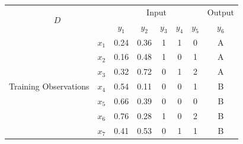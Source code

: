 \documentclass{article}
\begin{document}
\begin{table}[h!]
  \centering
  \begin{tabular}{|cc|ccccc|c|}
    \hline
    \multicolumn{2}{|c|}{\multirow{2}{*}{$D$}}                           & \multicolumn{5}{c|}{Input}                                                                                                & \multicolumn{1}{l|}{Output} \\ \cline{3-8} 
    \multicolumn{2}{|c|}{}                                               & \multicolumn{1}{c|}{$y_1$} & \multicolumn{1}{c|}{$y_2$} & \multicolumn{1}{c|}{$y_3$} & \multicolumn{1}{c|}{$y_4$} & $y_5$ & $y_6$                       \\ \hline
    \multicolumn{1}{|c|}{\multirow{7}{*}{Training Observations}} & $x_1$ & \multicolumn{1}{c|}{0.24}  & \multicolumn{1}{c|}{0.36}  & \multicolumn{1}{c|}{1}     & \multicolumn{1}{c|}{1}     & 0     & A                           \\ \cline{2-8} 
    \multicolumn{1}{|c|}{}                                       & $x_2$ & \multicolumn{1}{c|}{0.16}  & \multicolumn{1}{c|}{0.48}  & \multicolumn{1}{c|}{1}     & \multicolumn{1}{c|}{0}     & 1     & A                           \\ \cline{2-8} 
    \multicolumn{1}{|c|}{}                                       & $x_3$ & \multicolumn{1}{c|}{0.32}  & \multicolumn{1}{c|}{0.72}  & \multicolumn{1}{c|}{0}     & \multicolumn{1}{c|}{1}     & 2     & A                           \\ \cline{2-8} 
    \multicolumn{1}{|c|}{}                                       & $x_4$ & \multicolumn{1}{c|}{0.54}  & \multicolumn{1}{c|}{0.11}  & \multicolumn{1}{c|}{0}     & \multicolumn{1}{c|}{0}     & 1     & B                           \\ \cline{2-8} 
    \multicolumn{1}{|c|}{}                                       & $x_5$ & \multicolumn{1}{c|}{0.66}  & \multicolumn{1}{c|}{0.39}  & \multicolumn{1}{c|}{0}     & \multicolumn{1}{c|}{0}     & 0     & B                           \\ \cline{2-8} 
    \multicolumn{1}{|c|}{}                                       & $x_6$ & \multicolumn{1}{c|}{0.76}  & \multicolumn{1}{c|}{0.28}  & \multicolumn{1}{c|}{1}     & \multicolumn{1}{c|}{0}     & 2     & B                           \\ \cline{2-8} 
    \multicolumn{1}{|c|}{}                                       & $x_7$ & \multicolumn{1}{c|}{0.41}  & \multicolumn{1}{c|}{0.53}  & \multicolumn{1}{c|}{0}     & \multicolumn{1}{c|}{1}     & 1     & B                           \\ \hline

\end{tabular}
\end{table}
\end{document}
